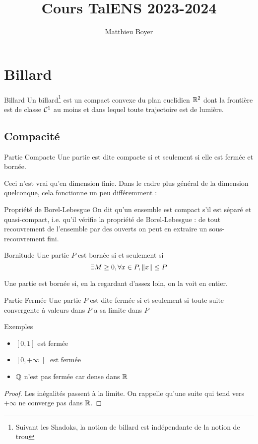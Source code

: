 \documentclass{cours}
\title{Cours TalENS 2023-2024}
\author{Matthieu Boyer}
\begin{document}
\section{Billard}
\begin{définition}{Billard}{}
Un billard\footnote{Suivant les Shadoks, la notion de billard est indépendante de la notion de trou} est un compact convexe du plan euclidien $\mathbb{R}^{2}$ dont la frontière est de classe $\mathcal{C}^{1}$ au moins et dans lequel toute trajectoire est de lumière.
\end{définition}

\subsection{Compacité}
\begin{définition}{Partie Compacte}{}
Une partie est dite compacte si et seulement si elle est fermée et bornée.
\end{définition}
Ceci n'est vrai qu'en dimension finie. Dans le cadre plus général de la dimension quelconque, cela fonctionne un peu différemment :
\begin{définition}{Propriété de Borel-Lebesgue}{}
On dit qu'un ensemble est compact s'il est séparé et quasi-compact, i.e. qu'il vérifie la propriété de Borel-Lebesgue : de tout recouvrement de l'ensemble par des ouverts on peut en extraire un sous-recouvrement fini.
\end{définition}

\begin{définition}{Bornitude}{} Une partie $P$ est bornée si et seulement si \[\exists M \geq 0, \forall x \in P, \left\lVert x \right\rVert \leq P\]
\end{définition}
Une partie est bornée si, en la regardant d'assez loin, on la voit en entier.
\begin{définition}{Partie Fermée}{}
Une partie $P$ est dite fermée si et seulement si toute suite convergente à valeurs dans $P$ a sa limite dans $P$
\end{définition}
\begin{propositionfr}{Exemples}{}
    \begin{itemize}
        \item $\left[0, 1\right]$ est fermée
        \item $\left[0, +\infty\right[$ est fermée
        \item $\mathbb{Q}$ n'est pas fermée car dense dans $\mathbb{R}$
    \end{itemize}
\end{propositionfr}
\begin{proof}
    Les inégalités passent à la limite. On rappelle qu'une suite qui tend vers $+\infty$ ne converge pas dans $\mathbb{R}$.
\end{proof}
\end{document}
